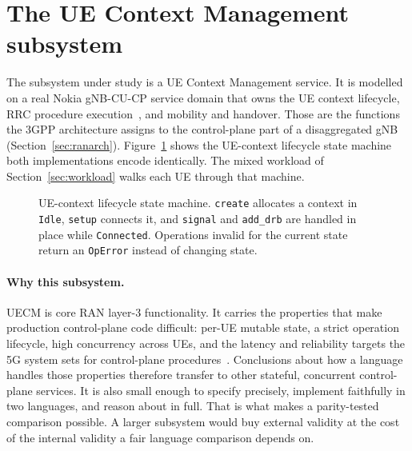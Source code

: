\documentclass[english,oneside,a4paper,censored,csm,software-track-2020]{HYthesisML}
\begin{document}
\section{The UE Context Management subsystem}\label{sec:uecm}
The subsystem under study is a UE Context Management service. It is modelled on a real Nokia
gNB-CU-CP service domain that owns the UE context lifecycle, RRC procedure
execution~\cite{3gpp38331}, and mobility and handover. Those are the functions the 3GPP
architecture assigns to the control-plane part of a disaggregated gNB
(Section~\ref{sec:ranarch}). Figure~\ref{fig:fsm} shows the UE-context lifecycle state machine
both implementations encode identically. The mixed workload of Section~\ref{sec:workload}
walks each UE through that machine.

\begin{figure}[ht]
\centering
{}
\caption[UE-context lifecycle state machine]{UE-context lifecycle state machine. \texttt{create} allocates a context in
\texttt{Idle}, \texttt{setup} connects it, and \texttt{signal} and \texttt{add\_drb} are handled
in place while \texttt{Connected}. Operations invalid for the current state return an
\texttt{OpError} instead of changing state.\label{fig:fsm}}
\end{figure}

\paragraph{Why this subsystem.}
UECM is core RAN layer-3 functionality. It carries the properties that make production
control-plane code difficult: per-UE mutable state, a strict operation lifecycle, high
concurrency across UEs, and the latency and reliability targets the 5G system sets for
control-plane procedures~\cite{3gpp38913,3gpp22261}. Conclusions about how a language handles
those properties therefore transfer to other stateful, concurrent control-plane services. It
is also small enough to specify precisely, implement faithfully in two languages, and reason
about in full. That is what makes a parity-tested comparison possible. A larger subsystem would
buy external validity at the cost of the internal validity a fair language comparison depends
on.
\end{document}
